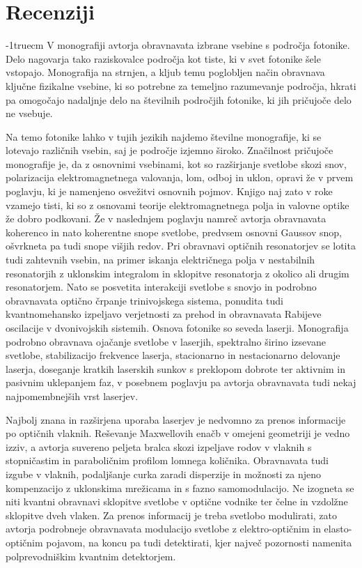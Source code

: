 \documentclass[a4paper,10pt,fleqn]{book}
\begin{document}

\lihastran
{}
\chapter*{Recenziji}
\vglue-1truecm
V monografiji avtorja obravnavata izbrane vsebine s področja fotonike. 
Delo nagovarja tako raziskovalce področja kot tiste, ki v svet fotonike 
šele vstopajo. Monografija na strnjen, a kljub temu poglobljen način 
obravnava ključne fizikalne vsebine, ki so potrebne za temeljno razumevanje 
področja, hkrati pa omogočajo nadaljnje delo na številnih področjih fotonike,
ki jih pričujoče delo ne vsebuje.

Na temo fotonike lahko v tujih jezikih najdemo številne monografije, ki se lotevajo različnih vsebin, saj je področje izjemno široko. Značilnost pričujoče monografije je, da z osnovnimi vsebinami, kot so razširjanje svetlobe skozi snov, polarizacija elektromagnetnega valovanja, lom, odboj in uklon, opravi že v prvem poglavju, ki je namenjeno osvežitvi osnovnih pojmov. Knjigo naj zato v roke vzamejo tisti, ki so z osnovami teorije elektromagnetnega polja in valovne optike že dobro podkovani. Že v naslednjem poglavju namreč avtorja obravnavata koherenco in nato koherentne snope svetlobe, predvsem osnovni Gaussov snop, ošvrkneta pa tudi snope višjih redov. Pri obravnavi optičnih resonatorjev se lotita tudi zahtevnih vsebin, na primer iskanja električnega polja v nestabilnih resonatorjih z uklonskim integralom in sklopitve resonatorja z okolico ali drugim resonatorjem. Nato se posvetita interakciji svetlobe s snovjo in podrobno obravnavata optično črpanje trinivojskega sistema, ponudita tudi kvantnomehansko izpeljavo verjetnosti za prehod in obravnavata Rabijeve oscilacije v dvonivojskih sistemih. Osnova fotonike so seveda laserji. Monografija podrobno obravnava ojačanje svetlobe v laserjih, spektralno širino izsevane svetlobe, stabilizacijo frekvence laserja, stacionarno in nestacionarno delovanje laserja, doseganje kratkih laserskih sunkov s preklopom dobrote ter aktivnim in pasivnim uklepanjem faz, v posebnem poglavju pa avtorja obravnavata tudi nekaj najpomembnejših vrst laserjev.

Najbolj znana in razširjena uporaba laserjev je nedvomno za prenos informacije po optičnih vlaknih. Reševanje Maxwellovih enačb v omejeni geometriji je vedno izziv, a avtorja suvereno peljeta bralca skozi izpeljave rodov v vlaknih s stopničastim in paraboličnim profilom lomnega količnika. Obravnavata tudi izgube v vlaknih, podaljšanje curka zaradi disperzije in možnosti za njeno kompenzacijo z uklonskima mrežicama in s fazno samomodulacijo. Ne izogneta se niti kvantni obravnavi sklopitve svetlobe v optične vodnike ter čelne in vzdolžne sklopitve dveh vlaken. Za prenos informacij je treba svetlobo modulirati, zato avtorja podrobneje obravnavata modulacijo svetlobe z elektro-optičnim in elasto-optičnim pojavom, na koncu pa tudi detektirati, kjer največ pozornosti namenita polprevodniškim kvantnim detektorjem.
\end{document}
